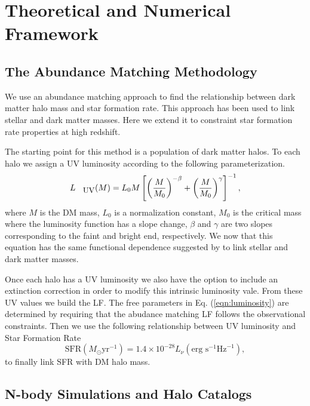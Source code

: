 \documentclass{emulateapj}
\begin{document}
\section{Theoretical and Numerical Framework}
\label{sec:methodology}


\subsection{The Abundance Matching Methodology}
We use an abundance matching approach to find the relationship between
dark matter halo mass and star formation rate. 
This approach has been used to link stellar and dark matter masses. 
Here we extend it to constraint star formation rate properties at high
redshift. 

The starting point for this method is a population of dark matter halos.
To each halo we assign a UV luminosity according to the following
parameterization.
  \begin{equation}\label{eqn:luminosity}
  L_{\textrm{\small{UV}}} (M) = L_{0} M \left[ \left( \frac{M}{M_0}\right)^{-\beta} 
		   + \left( \frac{M}{M_0}\right)^{\gamma} 
               \right]^{-1},
  \end{equation}
where $M$ is the DM mass, $L_{0}$ is a normalization constant, $M_0$
is the critical mass where the luminosity function has a slope change, 
$\beta$ and $\gamma$ are two slopes corresponding to the faint and
bright end, respectively. 
We now that this equation has the same functional dependence suggested
 by \citet{Moster10} to link stellar and dark matter masses.

Once each halo has a UV luminosity we also have the option to include
an extinction correction in order to modify this intrinsic luminosity
vale. 
From these UV values we build the LF.
The free parameters in Eq. (\ref{eqn:luminosity}) are determined by
requiring that the abudance matching LF follows the observational
constraints. 
Then we use the following relationship between UV luminosity and Star Formation Rate
\citep{Madau98,Kennicutt98} 
\begin{equation}
 \textrm{SFR}\left(M_\odot \textrm{yr}^{-1}\right) 
      = 1.4 \times 10^{-28} L_{\nu} \left( \textrm{erg s}^{-1}\textrm{Hz}^{-1} 
	\right), 
\end{equation}
to finally link SFR with DM halo mass.



\subsection{N-body Simulations and Halo Catalogs}
\end{document}
